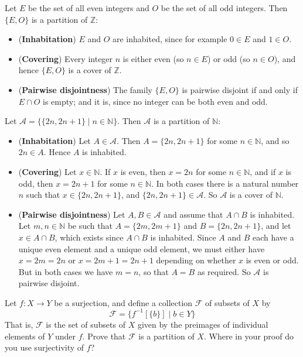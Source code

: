 \begin{example}
\label{exPartitionOfZIntoEvenAndOdd}
Let $E$ be the set of all even integers and $O$ be the set of all odd integers. Then $\{ E, O \}$ is a partition of $\mathbb{Z}$:
\begin{itemize}
\item (\textbf{Inhabitation}) $E$ and $O$ are inhabited, since for example $0 \in E$ and $1 \in O$.
\item (\textbf{Covering}) Every integer $n$ is either even (so $n \in E$) or odd (so $n \in O$), and hence $\{ E, O \}$ is a cover of $\mathbb{Z}$.
\item (\textbf{Pairwise disjointness}) The family $\{ E, O \}$ is pairwise disjoint if and only if $E \cap O$ is empty; and it is, since no integer can be both even and odd.
\end{itemize}
\end{example}

\begin{example}
\label{exPartitionOfNIntoPairs}
Let $\mathcal{A} = \{ \{ 2n, 2n+1 \} \mid n \in \mathbb{N} \}$. Then $\mathcal{A}$ is a partition of $\mathbb{N}$:
\begin{itemize}
\item (\textbf{Inhabitation}) Let $A \in \mathcal{A}$. Then $A = \{ 2n, 2n+1 \}$ for some $n \in \mathbb{N}$, and so $2n \in A$. Hence $A$ is inhabited.
\item (\textbf{Covering}) Let $x \in \mathbb{N}$. If $x$ is even, then $x=2n$ for some $n \in \mathbb{N}$, and if $x$ is odd, then $x=2n+1$ for some $n \in \mathbb{N}$. In both cases there is a natural number $n$ such that $x \in \{ 2n, 2n+1 \}$, and $\{ 2n, 2n+1 \} \in \mathcal{A}$. So $\mathcal{A}$ is a cover of $\mathbb{N}$.
\item (\textbf{Pairwise disjointness}) Let $A,B \in \mathcal{A}$ and assume that $A \cap B$ is inhabited. Let $m,n \in \mathbb{N}$ be such that $A = \{ 2m, 2m+1 \}$ and $B = \{ 2n, 2n+1 \}$, and let $x \in A \cap B$, which exists since $A \cap B$ is inhabited. Since $A$ and $B$ each have a unique even element and a unique odd element, we must either have $x=2m=2n$ or $x=2m+1=2n+1$ depending on whether $x$ is even or odd. But in both cases we have $m=n$, so that $A=B$ as required. So $\mathcal{A}$ is pairwise disjoint.
\end{itemize}
\end{example}

\begin{exercise}
\label{exPreimagesFormPartition}
Let $f : X \to Y$ be a surjection, and define a collection $\mathcal{F}$ of subsets of $X$ by
\[ \mathcal{F} = \{ f^{-1}[\{b\}] \mid b \in Y \} \]
That is, $\mathcal{F}$ is the set of subsets of $X$ given by the preimages of individual elements of $Y$ under $f$. Prove that $\mathcal{F}$ is a partition of $X$. Where in your proof do you use surjectivity of $f$?
\end{exercise}

